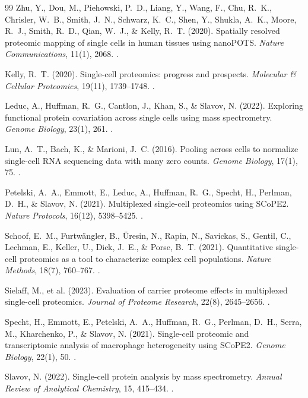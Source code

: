 \documentclass[11pt,twoside,openright]{book}
\begin{document}
\begin{thebibliography}{99}
Zhu, Y., Dou, M., Piehowski, P.~D., Liang, Y., Wang, F., Chu, R.~K., Chrisler, W.~B., Smith, J.~N., Schwarz, K.~C., Shen, Y., Shukla, A.~K., Moore, R.~J., Smith, R.~D., Qian, W.~J., \& Kelly, R.~T. (2020). Spatially resolved proteomic mapping of single cells in human tissues using nanoPOTS. \textit{Nature Communications}, 11(1), 2068. .

Kelly, R.~T. (2020). Single-cell proteomics: progress and prospects. \textit{Molecular \& Cellular Proteomics}, 19(11), 1739--1748. .

Leduc, A., Huffman, R.~G., Cantlon, J., Khan, S., \& Slavov, N. (2022). Exploring functional protein covariation across single cells using mass spectrometry. \textit{Genome Biology}, 23(1), 261. .

Lun, A.~T., Bach, K., \& Marioni, J.~C. (2016). Pooling across cells to normalize single-cell RNA sequencing data with many zero counts. \textit{Genome Biology}, 17(1), 75. .

Petelski, A.~A., Emmott, E., Leduc, A., Huffman, R.~G., Specht, H., Perlman, D.~H., \& Slavov, N. (2021). Multiplexed single-cell proteomics using SCoPE2. \textit{Nature Protocols}, 16(12), 5398--5425. .

Schoof, E.~M., Furtw\"angler, B., \"Uresin, N., Rapin, N., Savickas, S., Gentil, C., Lechman, E., Keller, U., Dick, J.~E., \& Porse, B.~T. (2021). Quantitative single-cell proteomics as a tool to characterize complex cell populations. \textit{Nature Methods}, 18(7), 760--767. .

Sielaff, M., et al. (2023). Evaluation of carrier proteome effects in multiplexed single-cell proteomics. \textit{Journal of Proteome Research}, 22(8), 2645--2656. .

Specht, H., Emmott, E., Petelski, A.~A., Huffman, R.~G., Perlman, D.~H., Serra, M., Kharchenko, P., \& Slavov, N. (2021). Single-cell proteomic and transcriptomic analysis of macrophage heterogeneity using SCoPE2. \textit{Genome Biology}, 22(1), 50. .

Slavov, N. (2022). Single-cell protein analysis by mass spectrometry. \textit{Annual Review of Analytical Chemistry}, 15, 415--434. .


\end{thebibliography}
\end{document}
